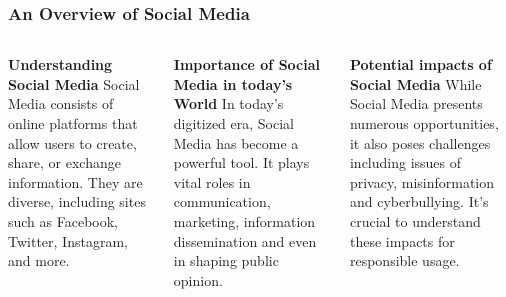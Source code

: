 \documentclass[5pt]{beamer}
\begin{document}
\begin{frame}
\frametitle{An Overview of Social Media}
\begin{columns}
\begin{column}{0.3\textwidth}
\begin{block}{\textbf{Understanding Social Media}}
Social Media consists of online platforms that allow users to create, share, or exchange information. They are diverse, including sites such as Facebook, Twitter, Instagram, and more.
\end{block}
\end{column}
\begin{column}{0.3\textwidth}
\begin{block}{\textbf{Importance of Social Media in today's World}}
In today's digitized era, Social Media has become a powerful tool. It plays vital roles in communication, marketing, information dissemination and even in shaping public opinion.
\end{block}
\end{column}
\begin{column}{0.3\textwidth}
\begin{block}{\textbf{Potential impacts of Social Media}}
While Social Media presents numerous opportunities, it also poses challenges including issues of privacy, misinformation and cyberbullying. It's crucial to understand these impacts for responsible usage.
\end{block}
\end{column}
\end{columns}
\end{frame}
\end{document}
